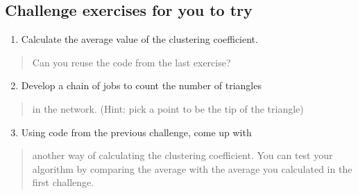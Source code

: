 \documentclass[letterpaper,10pt,openany,oneside]{sphinxmanual}
\begin{document}
\subsection{Challenge exercises for you to try}
\label{1-AdvancedNetwork/AdvancedNetwork:challenge-exercises-for-you-to-try}\begin{enumerate}
\item {} 
Calculate the average value of the clustering coefficient.

\end{enumerate}
\begin{quote}

Can you reuse the code from the last exercise?
\end{quote}
\begin{enumerate}
\setcounter{enumi}{1}
\item {} 
Develop a chain of jobs to count the number of triangles

\end{enumerate}
\begin{quote}

in the network. (Hint: pick a point to be the tip of
the triangle)
\end{quote}
\begin{enumerate}
\setcounter{enumi}{2}
\item {} 
Using code from the previous challenge, come up with

\end{enumerate}
\begin{quote}

another way of calculating the clustering coefficient.
You can test your algorithm by comparing the average
with the average you calculated in the first challenge.
\end{quote}



\renewcommand{\indexname}{Index}
\printindex
\end{document}
